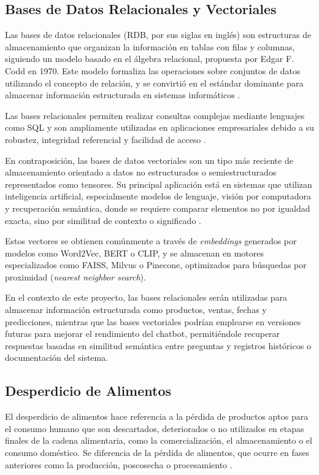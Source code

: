 \subsection{Bases de Datos Relacionales y Vectoriales}

Las bases de datos relacionales (RDB, por sus siglas en inglés) son estructuras de almacenamiento que organizan la información en tablas con filas y columnas, siguiendo un modelo basado en el álgebra relacional, propuesta por Edgar F. Codd en 1970. Este modelo formaliza las operaciones sobre conjuntos de datos utilizando el concepto de relación, y se convirtió en el estándar dominante para almacenar información estructurada en sistemas informáticos \parencite{codd1970}. 

Las bases relacionales permiten realizar consultas complejas mediante lenguajes como SQL y son ampliamente utilizadas en aplicaciones empresariales debido a su robustez, integridad referencial y facilidad de acceso \parencite{coronel2020}.

En contraposición, las bases de datos vectoriales son un tipo más reciente de almacenamiento orientado a datos no estructurados o semiestructurados representados como tensores. Su principal aplicación está en sistemas que utilizan inteligencia artificial, especialmente modelos de lenguaje, visión por computadora y recuperación semántica, donde se requiere comparar elementos no por igualdad exacta, sino por similitud de contexto o significado \parencite{johnson2019}.

Estos vectores se obtienen comúnmente a través de \textit{embeddings} generados por modelos como Word2Vec, BERT o CLIP, y se almacenan en motores especializados como FAISS, Milvus o Pinecone, optimizados para búsquedas por proximidad (\textit{nearest neighbor search}).

En el contexto de este proyecto, las bases relacionales serán utilizadas para almacenar información estructurada como productos, ventas, fechas y predicciones, mientras que las bases vectoriales podrían emplearse en versiones futuras para mejorar el rendimiento del chatbot, permitiéndole recuperar respuestas basadas en similitud semántica entre preguntas y registros históricos o documentación del sistema.

\subsection{Desperdicio de Alimentos}

El desperdicio de alimentos hace referencia a la pérdida de productos aptos para el consumo humano que son descartados, deteriorados o no utilizados en etapas finales de la cadena alimentaria, como la comercialización, el almacenamiento o el consumo doméstico. Se diferencia de la pérdida de alimentos, que ocurre en fases anteriores como la producción, poscosecha o procesamiento \parencite{fao2019}.

